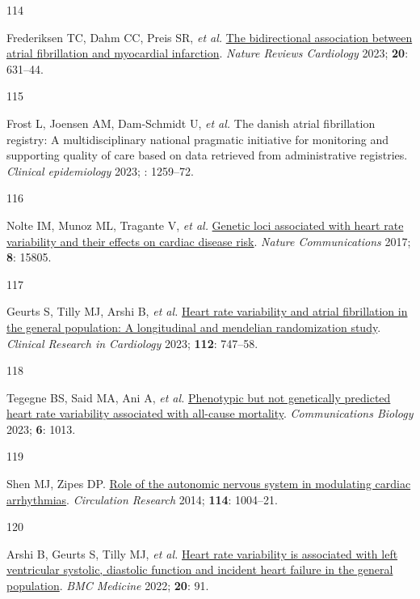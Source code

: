 \documentclass[
  a4paper,
  headsepline=true,
  open=any]{scrbook}
\newlength{\cslhangindent}
\newlength{\csllabelwidth}
\newlength{\cslentryspacingunit} %
\newenvironment{CSLReferences}[2] %
 {%
  \setlength{\parindent}{0pt}
  \ifodd #1
  \let\oldpar\par
  \def\par{\hangindent=\cslhangindent\oldpar}
  \fi
  \setlength{\parskip}{#2\cslentryspacingunit}
 }%
 {}
\newcommand{\CSLLeftMargin}[1]{\parbox[t]{\csllabelwidth}{#1}}
\newcommand{\CSLRightInline}[1]{\parbox[t]{\linewidth - \csllabelwidth}{#1}\break}
\begin{document}
\begin{CSLReferences}{0}{0}
\leavevmode{}%
\CSLLeftMargin{114 }%
\CSLRightInline{Frederiksen TC, Dahm CC, Preis SR, \emph{et al.}
\href{https://doi.org/10.1038/s41569-023-00857-3}{The bidirectional
association between atrial fibrillation and myocardial infarction}.
\emph{Nature Reviews Cardiology} 2023; \textbf{20}: 631--44.}

\leavevmode{}%
\CSLLeftMargin{115 }%
\CSLRightInline{Frost L, Joensen AM, Dam-Schmidt U, \emph{et al.} The
danish atrial fibrillation registry: A multidisciplinary national
pragmatic initiative for monitoring and supporting quality of care based
on data retrieved from administrative registries. \emph{Clinical
epidemiology} 2023; : 1259--72.}

\leavevmode{}%
\CSLLeftMargin{116 }%
\CSLRightInline{Nolte IM, Munoz ML, Tragante V, \emph{et al.}
\href{https://doi.org/10.1038/ncomms15805}{Genetic loci associated with
heart rate variability and their effects on cardiac disease risk}.
\emph{Nature Communications} 2017; \textbf{8}: 15805.}

\leavevmode{}%
\CSLLeftMargin{117 }%
\CSLRightInline{Geurts S, Tilly MJ, Arshi B, \emph{et al.}
\href{https://doi.org/10.1007/s00392-022-02072-5}{Heart rate variability
and atrial fibrillation in the general population: A longitudinal and
mendelian randomization study}. \emph{Clinical Research in Cardiology}
2023; \textbf{112}: 747--58.}

\leavevmode{}%
\CSLLeftMargin{118 }%
\CSLRightInline{Tegegne BS, Said MA, Ani A, \emph{et al.}
\href{https://doi.org/10.1038/s42003-023-05376-y}{Phenotypic but not
genetically predicted heart rate variability associated with all-cause
mortality}. \emph{Communications Biology} 2023; \textbf{6}: 1013.}

\leavevmode{}%
\CSLLeftMargin{119 }%
\CSLRightInline{Shen MJ, Zipes DP.
\href{https://doi.org/10.1161/CIRCRESAHA.113.302549}{Role of the
autonomic nervous system in modulating cardiac arrhythmias}.
\emph{Circulation Research} 2014; \textbf{114}: 1004--21.}

\leavevmode{}%
\CSLLeftMargin{120 }%
\CSLRightInline{Arshi B, Geurts S, Tilly MJ, \emph{et al.}
\href{https://doi.org/10.1186/s12916-022-02273-9}{Heart rate variability
is associated with left ventricular systolic, diastolic function and
incident heart failure in the general population}. \emph{BMC Medicine}
2022; \textbf{20}: 91.}


\end{CSLReferences}
\end{document}
